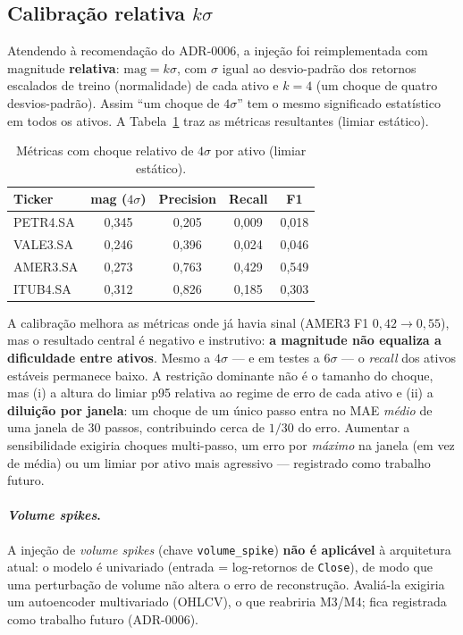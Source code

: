 \subsection{Calibração relativa \texorpdfstring{$k\sigma$}{k-sigma}}
\label{sec:m5-ksigma}
Atendendo à recomendação do ADR-0006, a injeção foi reimplementada com magnitude
\textbf{relativa}: $\text{mag} = k\sigma$, com $\sigma$ igual ao desvio-padrão dos retornos
escalados de treino (normalidade) de cada ativo e $k=4$ (um choque de quatro desvios-padrão).
Assim ``um choque de $4\sigma$'' tem o mesmo significado estatístico em todos os ativos. A
Tabela~\ref{tab:ksigma} traz as métricas resultantes (limiar estático).

\begin{table}[h]
\centering
\caption{Métricas com choque relativo de $4\sigma$ por ativo (limiar estático).}
\label{tab:ksigma}
\begin{tabular}{lcccc}
\toprule
\textbf{Ticker} & \textbf{mag ($4\sigma$)} & \textbf{Precision} & \textbf{Recall} & \textbf{F1} \\
\midrule
PETR4.SA & 0{,}345 & 0{,}205 & 0{,}009 & 0{,}018 \\
VALE3.SA & 0{,}246 & 0{,}396 & 0{,}024 & 0{,}046 \\
AMER3.SA & 0{,}273 & 0{,}763 & 0{,}429 & 0{,}549 \\
ITUB4.SA & 0{,}312 & 0{,}826 & 0{,}185 & 0{,}303 \\
\bottomrule
\end{tabular}
\end{table}

A calibração melhora as métricas onde já havia sinal (AMER3 F1 $0{,}42 \to 0{,}55$), mas o
resultado central é negativo e instrutivo: \textbf{a magnitude não equaliza a dificuldade
entre ativos}. Mesmo a $4\sigma$ --- e em testes a $6\sigma$ --- o \emph{recall} dos ativos
estáveis permanece baixo. A restrição dominante não é o tamanho do choque, mas (i) a altura
do limiar p95 relativa ao regime de erro de cada ativo e (ii) a \textbf{diluição por janela}:
um choque de um único passo entra no MAE \emph{médio} de uma janela de 30 passos, contribuindo
cerca de $1/30$ do erro. Aumentar a sensibilidade exigiria choques multi-passo, um erro por
\emph{máximo} na janela (em vez de média) ou um limiar por ativo mais agressivo --- registrado
como trabalho futuro.

\paragraph{\emph{Volume spikes}.} A injeção de \emph{volume spikes} (chave
\texttt{volume\_spike}) \textbf{não é aplicável} à arquitetura atual: o modelo é univariado
(entrada = log-retornos de \texttt{Close}), de modo que uma perturbação de volume não altera o
erro de reconstrução. Avaliá-la exigiria um autoencoder multivariado (OHLCV), o que reabriria
M3/M4; fica registrada como trabalho futuro (ADR-0006).
